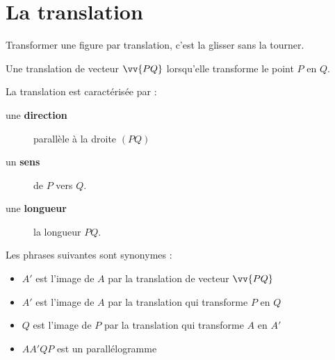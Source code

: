 \documentclass[main.tex]{subfiles}
\begin{document}
\section{La translation} 
Transformer une figure par translation, c’est la glisser sans la tourner. 
\begin{definition}
	Une translation de vecteur $\vv{PQ}$ lorsqu'elle transforme le point $P$ en $Q$.
	
	La translation est caractérisée par :
	\begin{description} 
		\item[une \textbf{direction}] parallèle à la droite $(PQ)$
		\item[un \textbf{sens}] de $P$ vers $Q$.
		\item[une \textbf{longueur}] la longueur $PQ$.
	\end{description} 
\end{definition}
Les phrases suivantes sont synonymes :
\begin{itemize}[label=\textbullet, left=-0.2em]
	\item  $A'$ est l'image de $A$ par la translation de vecteur $\vv{PQ}$ 
	\item   $A'$ est l'image de $A$ par la translation qui transforme $P$ en $Q$ 
	\item   $Q$ est l'image de $P$ par la translation qui transforme $A$ en $A'$ 
	\item   $AA'QP$ est un parallélogramme
\end{itemize}  
\end{document}
